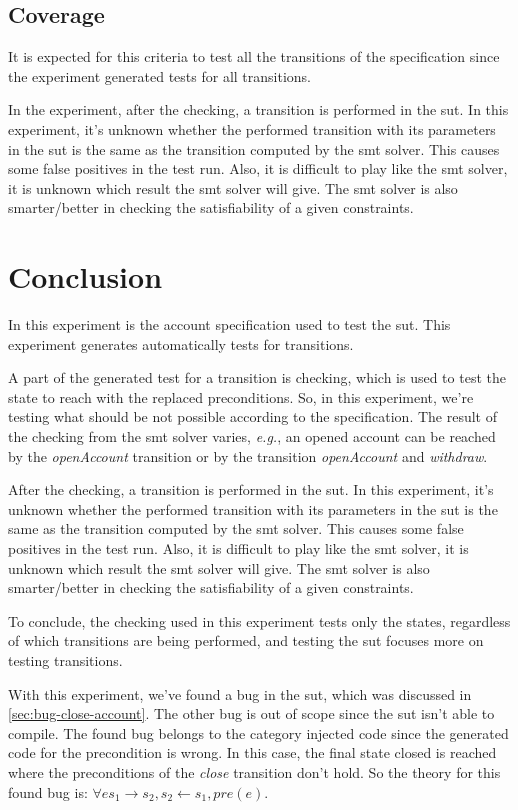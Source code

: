 \subsection{Coverage}
It is expected for this criteria to test all the transitions of the
specification since the experiment generated tests for all transitions.

In the experiment, after the checking, a transition
is performed in the \gls{sut}. In this experiment, it's unknown whether the
performed transition with its parameters in the \gls{sut} is the same as the
transition computed by the \gls{smt} solver. This causes some false positives in the
test run. Also, it is difficult to play like the \gls{smt} solver, it is unknown which
result the \gls{smt} solver will give. The \gls{smt} solver is also smarter/better in checking
the satisfiability of a given constraints.

\section{Conclusion}
In this experiment is the account specification used to test the \gls{sut}.
This experiment generates automatically tests for transitions.

A part of
the generated test for a transition is checking, which is used to test the state to
reach with the replaced preconditions. So, in this experiment, we're
testing what should be not possible according to the specification. The result
of the checking from the \gls{smt} solver varies, \textit{e.g.}, an opened account can be
reached by the \textit{openAccount} transition or by the transition
\textit{openAccount} and \textit{withdraw}.

After the checking, a transition
is performed in the \gls{sut}. In this experiment, it's unknown whether the
performed transition with its parameters in the \gls{sut} is the same as the
transition computed by the \gls{smt} solver. This causes some false positives in the
test run. Also, it is difficult to play like the \gls{smt} solver, it is unknown which
result the \gls{smt} solver will give. The \gls{smt} solver is also smarter/better in checking
the satisfiability of a given constraints.

To conclude, the checking used in this experiment tests only the states, regardless of which transitions are
being performed, and testing the \gls{sut} focuses more on testing transitions.

With this experiment, we've found a bug in the \gls{sut}, which was
discussed in \autoref{sec:bug-close-account}. The other bug is out of scope
since the \gls{sut} isn't able to compile. The found bug belongs to the category
injected code since the generated code for the precondition is wrong. In this
case, the final state closed is reached where the preconditions of the \textit{close}
transition don't hold. So the theory for this found bug is:
$\forall e s_{1} \to s_{2}, s_{2} \gets s_{1}, pre(e)$.


